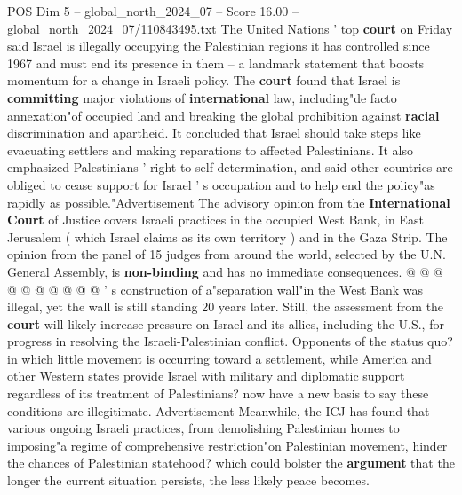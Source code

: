 \begin{textsample}{POS Dim 5 – global\_north\_2024\_07 – Score 16.00 – global\_north\_2024\_07/110843495.txt}  \label{ex:f5_pos_304}
The United Nations ' top \textbf{court} on Friday said Israel is illegally occupying the Palestinian regions it has controlled since 1967 and must end its presence in them -- a landmark statement that boosts momentum for a change in Israeli policy.
The \textbf{court} found that Israel is \textbf{committing} major violations of \textbf{international} law, including"de facto annexation"of occupied land and breaking the global prohibition against \textbf{racial} discrimination and apartheid.
It concluded that Israel should take steps like evacuating settlers and making reparations to affected Palestinians.
It also emphasized Palestinians ' right to self-determination, and said other countries are obliged to cease support for Israel ' s occupation and to help end the policy"as rapidly as possible."Advertisement The advisory opinion from the \textbf{International} \textbf{Court} of Justice covers Israeli practices in the occupied West Bank, in East Jerusalem ( which Israel claims as its own territory ) and in the Gaza Strip.
The opinion from the panel of 15 judges from around the world, selected by the U.N.
General Assembly, is \textbf{non-binding} and has no immediate consequences. @ @ @ @ @ @ @ @ @ @ ' s construction of a"separation wall"in the West Bank was illegal, yet the wall is still standing 20 years later.
Still, the assessment from the \textbf{court} will likely increase pressure on Israel and its allies, including the U.S., for progress in resolving the Israeli-Palestinian conflict.
Opponents of the status quo? in which little movement is occurring toward a settlement, while America and other Western states provide Israel with military and diplomatic support regardless of its treatment of Palestinians? now have a new basis to say these conditions are illegitimate.
Advertisement Meanwhile, the ICJ has found that various ongoing Israeli practices, from demolishing Palestinian homes to imposing"a regime of comprehensive restriction"on Palestinian movement, hinder the chances of Palestinian statehood? which could bolster the \textbf{argument} that the longer the current situation persists, the less likely peace becomes.

\end{textsample}
